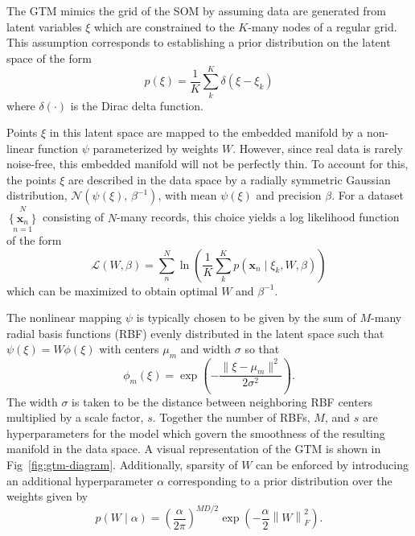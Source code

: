 \documentclass[remotesensing,article,submit,pdftex,moreauthors]{Definitions/mdpi}
\begin{document}
The GTM mimics the grid of the SOM by assuming data are generated from latent variables $\xi$ which are constrained to the $K$-many nodes of a regular grid. This assumption corresponds to establishing a prior distribution on the latent space of the form
\begin{equation}\label{eq:latent-prob}
    p(\xi) = \frac{1}{K}\sum_k^K \delta(\xi - \xi_k)
\end{equation}
where $\delta(\cdot)$ is the Dirac delta function.

Points $\xi$ in this latent space are mapped to the embedded manifold by a non-linear function $\psi$ parameterized by weights $W$. However, since real data is rarely noise-free, this embedded manifold will not be perfectly thin. To account for this, the points $\xi$ are described in the data space by a radially symmetric Gaussian distribution, $\mathcal{N}(\psi(\xi),\, \beta^{-1})$, with mean $\psi(\xi)$ and precision $\beta$. For a dataset $\left\{ \mathbf{x}_n\right\}\limits_{n=1}^N$ consisting of $N$-many records, this choice yields a log likelihood function of the form
\begin{equation}\label{eq:llh}
    \mathcal{L}(W, \beta) = \sum_n^N \ln \left(\dfrac{1}{K}\sum_k^K p(\mathbf{x}_n \mid \xi_k, W, \beta) \right)
\end{equation}
which can be maximized to obtain optimal $W$ and $\beta^{-1}$.

The nonlinear mapping $\psi$ is typically chosen to be given by the sum of $M$-many radial basis functions (RBF) evenly distributed in the latent space such that $\psi(\xi) = W\phi(\xi)$ with centers $\mu_m$ and width $\sigma$ so that
\begin{equation}
    \phi_m(\xi) = \exp\left(-\dfrac{\lVert \xi - \mu_m \rVert^2}{2\sigma^2}\right).
\end{equation}
The width $\sigma$ is taken to be the distance between neighboring RBF centers multiplied by a scale factor, $s$. Together the number of RBFs, $M$, and $s$ are hyperparameters for the model which govern the smoothness of the resulting manifold in the data space. A visual representation of the GTM is shown in Fig~\ref{fig:gtm-diagram}. Additionally, sparsity of $W$ can be enforced by introducing an additional hyperparameter $\alpha$ corresponding to a prior distribution over the weights given by
\begin{equation}\label{eq:weight-prior}
    p(W \mid \alpha) =  \left( \frac{\alpha}{2\pi} \right)^{MD/2}\exp\left(-\frac{\alpha}{2}\left\lVert W \right\rVert_{F}^2\right).
\end{equation}
\end{document}
